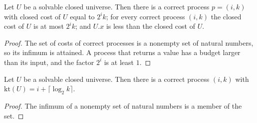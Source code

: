 \begin{theorem}
  \label{thm:information-closed-lower}
  \leanok
  Let $U$ be a solvable closed universe. Then there is a correct process $p = (i, k)$ with closed
  cost of $U$ equal to $2^i k$; for every correct process $(i, k)$ the closed cost of $U$ is at
  most $2^i k$; and $U.x$ is less than the closed cost of $U$.
  \own{}
\end{theorem}

\begin{proof}
  \leanok
  The set of costs of correct processes is a nonempty set of natural numbers, so its infimum is
  attained. A process that returns a value has a budget larger than its input, and the factor
  $2^i$ is at least $1$.
\end{proof}

\begin{theorem}
  \label{thm:information-kt-attained}
  \leanok
  Let $U$ be a solvable closed universe. Then there is a correct process $(i, k)$ with
  $\mathrm{kt}(U) = i + \lceil \log_2 k \rceil$.
  \own{}
\end{theorem}

\begin{proof}
  \leanok
  The infimum of a nonempty set of natural numbers is a member of the set.
\end{proof}


